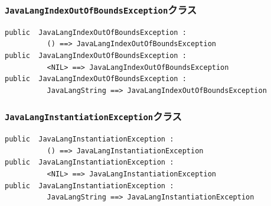 \documentclass[\pformat,12pt]{jarticle}
\begin{document}
\subsubsection{\texttt{JavaLangIndexOutOfBoundsException}クラス}
\begin{small}
\begin{verbatim}
public  JavaLangIndexOutOfBoundsException : 
          () ==> JavaLangIndexOutOfBoundsException
public  JavaLangIndexOutOfBoundsException : 
          <NIL> ==> JavaLangIndexOutOfBoundsException
public  JavaLangIndexOutOfBoundsException : 
          JavaLangString ==> JavaLangIndexOutOfBoundsException
\end{verbatim}
\end{small}

\subsubsection{\texttt{JavaLangInstantiationException}クラス}
\begin{small}
\begin{verbatim}
public  JavaLangInstantiationException : 
          () ==> JavaLangInstantiationException
public  JavaLangInstantiationException : 
          <NIL> ==> JavaLangInstantiationException
public  JavaLangInstantiationException : 
          JavaLangString ==> JavaLangInstantiationException
\end{verbatim}
\end{small}
\end{document}
